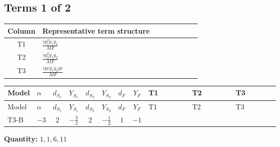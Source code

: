 \documentclass[8pt]{article}
\begin{document}
\begin{landscape}
\subsection*{Terms 1 of 2}
\begin{center}
\begin{tabular}{@{}c >{\raggedright\arraybackslash}p{0.82\linewidth}@{}}
\toprule
Column & Representative term structure \\
\midrule
T1 & \(\displaystyle \frac{i g_{1}^{2} \overline{y_{1}} \overline{y_{2}}}{MF}\) \\
\midrule
T2 & \(\displaystyle \frac{i g_{2}^{2} \overline{y_{1}} \overline{y_{2}}}{MF}\) \\
\midrule
T3 & \(\displaystyle \frac{i ye \overline{y_{1}} \overline{y_{2}} \overline{ye}}{MF}\) \\
\midrule
\bottomrule
\end{tabular}
\end{center}
\smallskip
\tiny
\begin{longtable}{@{}llcccccc >{\raggedright\arraybackslash}p{0.21\linewidth} >{\raggedright\arraybackslash}p{0.21\linewidth} >{\raggedright\arraybackslash}p{0.21\linewidth}@{}}
\toprule
Model & $\alpha$ & $d_{S_1}$ & $Y_{S_1}$ & $d_{S_2}$ & $Y_{S_2}$ & $d_F$ & $Y_F$ & T1 & T2 & T3 \\
\midrule
\endfirsthead
\toprule
Model & $\alpha$ & $d_{S_1}$ & $Y_{S_1}$ & $d_{S_2}$ & $Y_{S_2}$ & $d_F$ & $Y_F$ & T1 & T2 & T3 \\
\midrule
\endhead
T3-B & $-3$ & $2$ & $-\frac{3}{2}$ & $2$ & $-\frac{1}{2}$ & $1$ & $-1$ & \scriptsize\adjustbox{max width=\linewidth}{$\begin{gathered} \frac{3 i g_{1}^{2} \overline{y_{1}} \overline{y_{2}}}{2 MF}\end{gathered}$} & \scriptsize\adjustbox{max width=\linewidth}{$\begin{gathered} \frac{3 i g_{2}^{2} \overline{y_{1}} \overline{y_{2}}}{4 MF}\end{gathered}$} & \scriptsize\adjustbox{max width=\linewidth}{$\begin{gathered} - \frac{i ye \overline{y_{1}} \overline{y_{2}} \overline{ye}}{4 MF}\end{gathered}$} \\
\midrule
\bottomrule
\end{longtable}
\clearpage
\noindent\textbf{Quantity: }$\mathrm{1,1,6,11}$\par\smallskip

\end{landscape}
\end{document}
